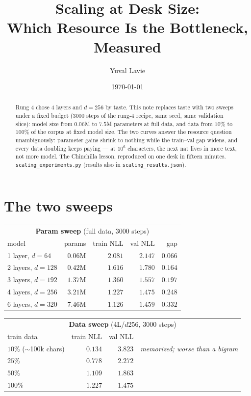 \documentclass[11pt]{article}
\title{Scaling at Desk Size:\\
Which Resource Is the Bottleneck, Measured}
\author{Yuval Lavie}
\date{\today}
\begin{document}
\maketitle

\begin{abstract}
Rung 4 chose 4 layers and $d = 256$ by taste. This note replaces
taste with two sweeps under a fixed budget (3000 steps of the rung-4
recipe, same seed, same validation slice): model size from $0.06$M to
$7.5$M parameters at full data, and data from $10\%$ to $100\%$ of
the corpus at fixed model size. The two curves answer the resource
question unambiguously: parameter gains shrink to nothing while the
train--val gap widens, and every data doubling keeps paying --- at
$10^6$ characters, the next nat lives in more text, not more model.
The Chinchilla lesson, reproduced on one desk in fifteen minutes.
\texttt{scaling\_experiments.py} (results also in
\texttt{scaling\_results.json}).
\end{abstract}

\section{The two sweeps}

\begin{center}
\begin{tabular}{lrrrr}
\toprule
\multicolumn{5}{c}{\textbf{Param sweep} (full data, 3000 steps)}\\
model & params & train NLL & val NLL & gap\\
\midrule
1 layer, $d{=}64$ & $0.06$M & $2.081$ & $2.147$ & $0.066$\\
2 layers, $d{=}128$ & $0.42$M & $1.616$ & $1.780$ & $0.164$\\
3 layers, $d{=}192$ & $1.37$M & $1.360$ & $1.557$ & $0.197$\\
4 layers, $d{=}256$ & $3.21$M & $1.227$ & $1.475$ & $0.248$\\
6 layers, $d{=}320$ & $7.46$M & $1.126$ & $1.459$ & $0.332$\\
\bottomrule
\end{tabular}
\end{center}

\begin{center}
\begin{tabular}{lrrr}
\toprule
\multicolumn{4}{c}{\textbf{Data sweep} (4L/$d$256, 3000 steps)}\\
train data & train NLL & val NLL & \\
\midrule
$10\%$ ($\sim$100k chars) & $0.134$ & $3.823$ &
  \emph{memorized; worse than a bigram}\\
$25\%$ & $0.778$ & $2.272$ & \\
$50\%$ & $1.109$ & $1.863$ & \\
$100\%$ & $1.227$ & $\mathbf{1.475}$ & \\
\bottomrule
\end{tabular}
\end{center}
\end{document}
